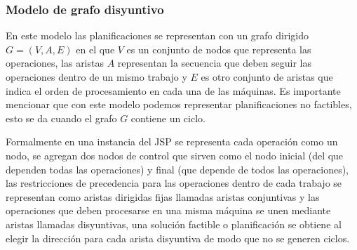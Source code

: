 \subsubsection*{Modelo de grafo disyuntivo} 
En este modelo las planificaciones se representan con un grafo dirigido $G=(V,A,E)$ en el que $V$ es un conjunto de nodos que representa las operaciones, las aristas $A$ representan la secuencia que deben seguir las operaciones dentro de un mismo trabajo y $E$ es otro conjunto de aristas que indica el orden de procesamiento en cada una de las máquinas. Es importante mencionar que con este modelo podemos representar planificaciones no factibles, esto se da cuando el grafo $G$ contiene un ciclo.


Formalmente en una instancia del JSP se representa cada operación como un nodo, se agregan dos nodos de control que sirven como el nodo inicial (del que dependen todas las operaciones) y final (que depende de todos las operaciones), las restricciones de precedencia para las operaciones dentro de cada trabajo se representan como aristas dirigidas fijas llamadas aristas conjuntivas y las operaciones que deben procesarse en una misma máquina se unen mediante aristas llamadas disyuntivas, una solución factible o planificación se obtiene al elegir la dirección para cada arista disyuntiva de modo que no se generen ciclos.   

